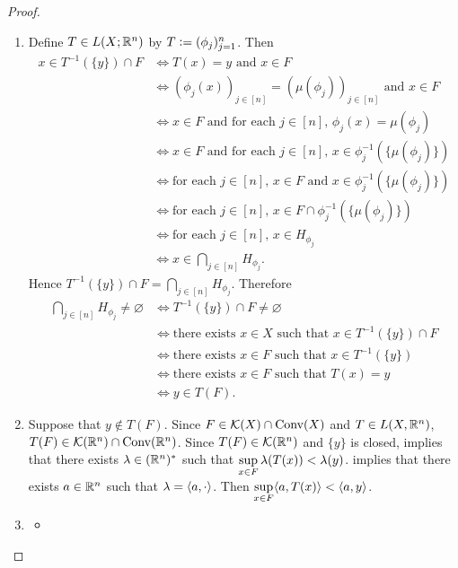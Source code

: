 \documentclass{book}
\begin{document}
\begin{proof}
\begin{enumerate}
			\item Define $T \in L(X;\mathbb{R}^n)$ by $T \vcentcolon= (\phi_j)_{j=1}^n$. Then 
			\begin{align*}
				x \in T^{-1}(\{y\}) \cap F 
				& \iff \text{$T(x) = y$ and $x \in F$} \\
				& \iff \text{$(\phi_j(x))_{j \in [n]} = (\mu(\phi_j))_{j \in [n]}$ and $x \in F$} \\
				& \iff \text{$x \in F$ and for each $j \in [n]$, $\phi_j(x) = \mu(\phi_j)$} \\
				& \iff \text{$x \in F$ and for each $j \in [n]$, $x \in \phi_j^{-1}(\{\mu(\phi_j)\})$} \\
				& \iff \text{for each $j \in [n]$, $x \in F$ and $x \in \phi_j^{-1}(\{\mu(\phi_j)\})$} \\
				& \iff \text{for each $j \in [n]$, $x \in F \cap \phi_j^{-1}(\{\mu(\phi_j)\})$} \\
				& \iff \text{for each $j \in [n]$, $x \in H_{\phi_j}$} \\
				& \iff x \in \bigcap\limits_{j \in [n]} H_{\phi_j}.
			\end{align*}
			Hence $T^{-1}(\{y\}) \cap F = \bigcap\limits_{j \in [n]} H_{\phi_j}$. Therefore
			\begin{align*}
				\bigcap\limits_{j \in [n]} H_{\phi_j} \neq \varnothing
				& \iff T^{-1}(\{y\}) \cap F \neq \varnothing \\
				& \iff \text{there exists $x \in X$ such that $x \in T^{-1}(\{y\}) \cap F $} \\
				& \iff \text{there exists $x \in F$ such that $x \in T^{-1}(\{y\})$} \\
				& \iff \text{there exists $x \in F$ such that $T(x) = y$} \\
				& \iff y \in T(F).
			\end{align*}
			\item Suppose that $y \not \in T(F)$. Since $F \in \mathcal{K}(X) \cap \text{Conv}(X)$ and $T \in L(X, \mathbb{R}^n)$, $T(F) \in \mathcal{K}(\mathbb{R}^n) \cap \text{Conv}(\mathbb{R}^n)$. Since $T(F) \in \mathcal{K}(\mathbb{R}^n)$ and $\{y\}$ is closed,  implies that there exists $\lambda \in (\mathbb{R}^n)^*$ such that $\sup\limits_{x \in F} \lambda(T(x)) < \lambda(y)$.  implies that there exists $a \in \mathbb{R}^n$ such that $\lambda = \langle a, \cdot \rangle$. Then $\sup\limits_{x \in F} \langle a, T(x) \rangle < \langle a, y \rangle$.
			\item 
			\begin{itemize}
				\item {} \\

\end{itemize}
\end{enumerate}
\end{proof}
\end{document}
